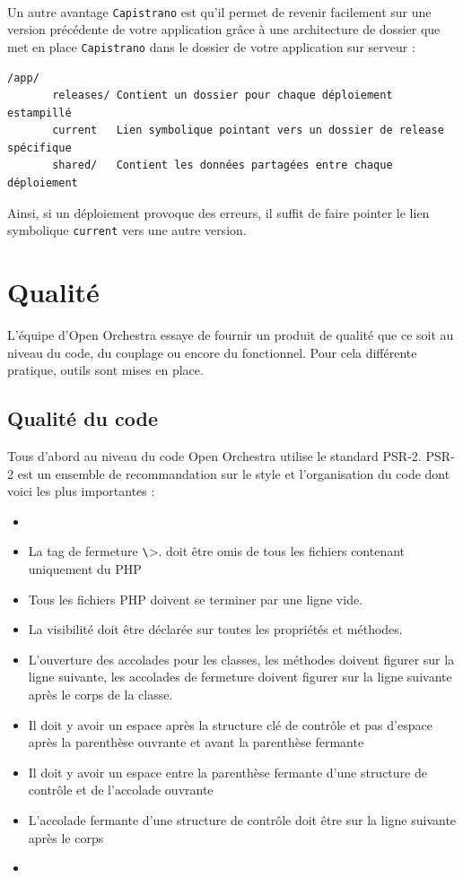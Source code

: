 \paragraph{}
Un autre avantage \verb?Capistrano? est qu'il permet de revenir facilement sur une version précédente de votre application grâce à une architecture de dossier que met en place \verb?Capistrano? dans le dossier de votre application sur serveur : 
\begin{verbatim}
/app/
       releases/ Contient un dossier pour chaque déploiement estampillé
       current   Lien symbolique pointant vers un dossier de release spécifique
       shared/   Contient les données partagées entre chaque déploiement
\end{verbatim}
Ainsi, si un déploiement provoque des erreurs, il suffit de faire pointer le lien symbolique \verb?current? vers une autre version.

\section{Qualité}
L'équipe d'Open Orchestra essaye de fournir un produit de qualité que ce soit au niveau du code, du couplage ou encore du fonctionnel. Pour cela différente pratique, outils sont mises en place.
\subsection{Qualité du code}
Tous d'abord au niveau du code Open Orchestra utilise le standard PSR-2. PSR-2 est un ensemble de recommandation sur le style et l'organisation du code dont voici les plus importantes : 
\begin{itemize}
\item[]
\item La tag de fermeture \verb?\?>. doit être omis de tous les fichiers contenant uniquement du PHP
\item Tous les fichiers PHP doivent se terminer par une ligne vide.
\item La visibilité doit être déclarée sur toutes les propriétés et méthodes.
\item L'ouverture des accolades pour les classes, les méthodes doivent figurer sur la ligne suivante, les accolades de fermeture doivent figurer sur la ligne suivante après le corps de la classe.
\item Il doit y avoir un espace après la structure clé de contrôle et pas d'espace après la parenthèse ouvrante et avant la parenthèse fermante
\item Il doit y avoir un espace entre la parenthèse fermante d'une structure de contrôle et de l'accolade
 ouvrante
 \item L'accolade fermante d'une structure de contrôle doit être sur la ligne suivante après le corps
 \item[]
\end{itemize}
